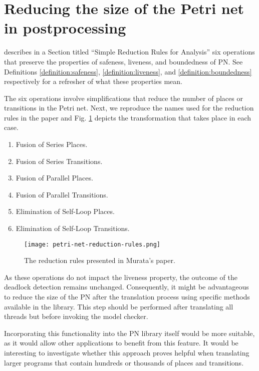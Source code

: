 \section{Reducing the size of the Petri net in postprocessing}
\label{sec:future-work-petri-net-reduction}

\cite{murata1989} describes in a Section titled ``Simple Reduction Rules for Analysis''
six operations that preserve the properties of safeness, liveness, and boundedness of \acrshort{PN}.
See Definitions \ref{definition:safeness}, \ref{definition:liveness}, and \ref{definition:boundedness}
respectively for a refresher of what these properties mean.

The six operations involve simplifications that reduce the number of places or transitions
in the Petri net. Next, we reproduce the names used for the reduction rules in the paper and
Fig. \ref{fig:petri-net-reduction-rules} depicts the transformation that takes place in each case.

\begin{enumerate}[label={\alph*)}]
  \item Fusion of Series Places.
  \item Fusion of Series Transitions.
  \item Fusion of Parallel Places.
  \item Fusion of Parallel Transitions.
  \item Elimination of Self-Loop Places.
  \item Elimination of Self-Loop Transitions.
\end{enumerate}

\begin{figure}[!htb]
  \centering
  \texttt{[image: petri-net-reduction-rules.png]}
  \caption{The reduction rules presented in Murata's paper.}
  \label{fig:petri-net-reduction-rules}
\end{figure}

As these operations do not impact the liveness property,
the outcome of the deadlock detection remains unchanged.
Consequently, it might be advantageous to reduce the size of the \acrshort{PN}
after the translation process using specific methods available in the  library.
This step should be performed after translating all threads but before invoking the model checker.

Incorporating this functionality into the \acrshort{PN} library itself would be more suitable,
as it would allow other applications to benefit from this feature.
It would be interesting to investigate whether
this approach proves helpful when translating larger programs
that contain hundreds or thousands of places and transitions.

